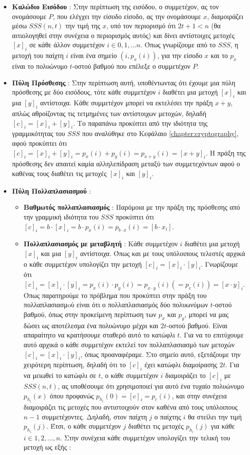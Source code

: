 \begin{itemize}
    \item \textbf{Καλώδιο Εισόδου} : Στην περίπτωση της εισόδου, ο συμμετέχον, ας τον ονομάσουμε $P$, που ελέγχει την είσοδο είσοδο, ας την ονομάσουμε $x$, διαμοιράζει μέσω $SSS(n,t)$ την τιμή της $x$, υπό τον περιορισμό ότι $2t + 1 < n$ (θα αιτιολογηθεί στην συνέχεια ο περιορισμός αυτός) και δίνει αντίστοιχες μετοχές $[x]_i$ σε κάθε άλλον συμμετέχον $i \in 0, 1, \ldots n$. Όπως γνωρίζουμε από το $SSS$, η μετοχή του παίχτη $i$ είναι ένα σημείο $(i, p_x(i))$, για την είσοδο $x$ και το $p_x$ είναι το πολυώνυμο $t$-οστού βαθμού που επέλεξε ο συμμετέχον $P$.
    \item \textbf{Πύλη Πρόσθεσης} : Στην περίπτωση αυτή, υποθέντωντας ότι έχουμε μια πύλη πρόσθεσης με δύο εισόδους, τότε κάθε συμμετέχον $i$ διαθέτει μια μετοχή $[x]_i$ και μια $[y]_i$ αντίστοιχα. Κάθε συμμετέχον μπορεί να εκτελέσει την πράξη $x+y$, απλώς αθροίζοντας τις τετμημένες των αντίστοιχων μετοχών, δηλαδή $[c]_i = [x]_i + [y]_i$. Το παραπάνω προκύπτει από την ιδιότητα της γραμμικότητας του $SSS$ που αναλύθηκε στο Κεφάλαιο \ref{chapter:cryptography}, αφού προκύπτει ότι $[c]_i = [x]_i + [y]_i = p_x(i) + p_y(i) = p_{x+y}(i) = [x + y]_i$. Η πράξη της πρόσθεσης δεν απαιτεί καμία αλληλεπίδραση μεταξύ των συμμετεχόντων αφού ο καθένας τους διαθέτει τις μετοχές $[x]_i$ και $[y]_i$.
    \item \textbf{Πύλη Πολλαπλασιασμού} :
        \begin{itemize}
            \item \textbf{Βαθμωτός πολλαπλασιασμός} : Παρόμοια με την πράξη της πρόσθεσης από την γραμμική ιδιότητα του $SSS$ προκύπτει ότι $[c]_i = b \cdot [x]_i = b \cdot p_x(i) = p_{b \cdot x}(i) = [b \cdot x_i ]$.
            \item \textbf{Πολλαπλασιασμός με μεταβλητή} : Κάθε συμμετέχον $i$ διαθέτει μια μετοχή $[x]_i$ και μια $[y]_i$ αντίστοιχα. Όπως και με τους υπόλοιπους τελεστές αρχικά ο κάθε συμμετέχον υπολογίζει την μετοχή $[c]_i = [x]_i \cdot [y]_i$. Γνωρίζουμε ότι $[c]_i = [x]_i \cdot [y]_i = p_x(i) \cdot p_y(i) = p_{x \cdot y}(i) (= p_c(i))= [x \cdot y]_i$. Όπως παρατηρούμε το πρόβλημα που προκύπτει στην πράξη του πολλαπλασιασμoύ είναι ότι ο πολλαπλασιασμός δύο πολυωνύμων $t$-οστού βαθμού, όπως στην προκείμενη περίπτωση των $p_x$ και $p_y$, μπορεί να μας δώσει ως αποτέλεσμα ένα πολυώνυμο μέχρι και $2t$-οστού βαθμού. Είναι απαραίτητο να κρατήσουμε σταθερό αυτό το κατώφλι $t$. Για να το επιτύχουμε αυτό αρχικά ο κάθε συμμετέχον εκτελεί τον πολλαπλασιασμό των μετοχών $[c]_i = [x]_i \cdot [y]_i$, όπως προαναφέραμε. Στο σημείο αυτό, εξετάζουμε την χειρότερη περίπτωση, δηλαδή ότι το $[c]_i$ έχει κατώφλι διαμοίρασης $2t$. Για να μειωθεί το κατώφλι σε $t$, ο κάθε συμμετέχον $i$ διαμοιράζει το $[c]_i$ με $SSS(n, t)$, ας υποθέσουμε ότι χρησιμοποιεί για αυτό ένα τυχαίο πολυώνυμο $p_{h_i}(x)$ όπου προφανώς $p_{h_i}(0)=[c]_i=p_c(i)$, και στην συνέχεια διαμοιράζει τις μετοχές που αντιστοιχούν στον καθένα από τους υπόλοιπους $n-1$ συμμετέχοντες. Δηλαδή, στον παίχτη $j$ ο παίχτης $i$ θα στείλει την τιμή $p_{h_i}(j)$. Έτσι, ο κάθε συμμετέχον $j$ διαθέτει τις μετοχές $p_{h_i}(j)$ για κάθε $i \in 1, 2, \ldots, n$. Στην συνέχεια κάθε συμμετέχον υπολογίζει την τελική του μετοχή ως εξής :

\end{itemize}
\end{itemize}
